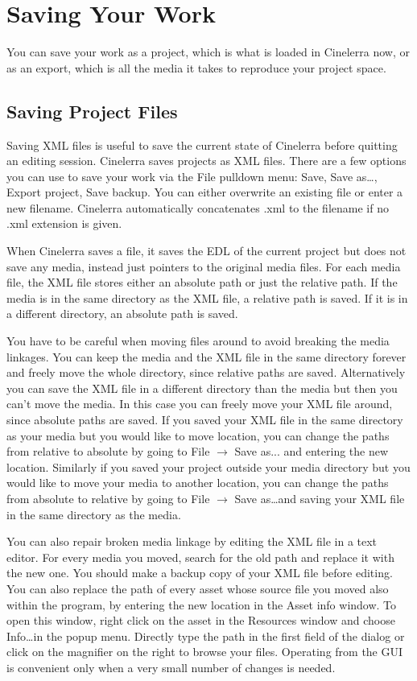 \section{Saving Your Work}%
\label{sec:saving_your_work}

You can save your work as a project, which is what is loaded in Cinelerra now, or as an export, which is all the media it takes to reproduce your project space.

\subsection{Saving Project Files}%
\label{sub:saving_project_files}

Saving  XML files is useful to save the current state of Cinelerra before quitting an editing session. Cinelerra saves projects as XML files. There are a few options you can use to save your work via the File pulldown menu: Save, Save as\dots, Export project, Save backup.  You can either overwrite an existing file or enter a new filename. Cinelerra automatically concatenates .xml to the filename if no .xml extension is given.

When Cinelerra saves a file, it saves the EDL of the current project but does not save any media, instead just pointers to the original media files. For each media file, the XML file stores either an absolute path or just the relative path. If the media is in the same directory as the XML file, a relative path is saved. If it is in a different directory, an absolute path is saved.

You have to be careful when moving files around to avoid breaking the media linkages. You can keep the media and the XML file in the same directory forever and freely move the whole directory, since relative paths are saved. Alternatively you can save the XML file in a different directory than the media but then you can't move the media. In this case you can freely move your XML file around, since absolute paths are saved. If you saved your XML file in the same directory as your media but you would like to move location, you can change the paths from relative to absolute by going
to File $\rightarrow$ Save as... and entering the new location. Similarly if you saved your project outside your media directory but you would like to move your media to another location, you can change the paths from absolute to relative by going to File $\rightarrow$ Save as\dots and saving your XML file in the same directory as the media.

You can also repair broken media linkage by editing the XML file in a text editor. For every media you moved, search for the old path and replace it with the new one. You should make a backup copy of your XML file before editing. You can also replace the path of every asset whose source file you moved also within the program, by entering the new location in the Asset info window. To open this window, right click on the asset in the Resources window and choose Info\dots in the popup menu. Directly type the path in the first field of the dialog or click on the magnifier on the right to browse your files. Operating
from the GUI is convenient only when a very small number of changes is needed.


